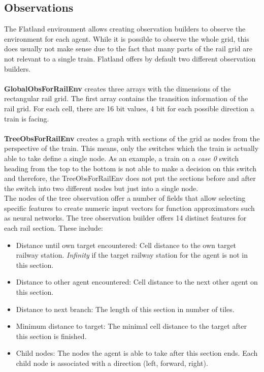 \subsection*{Observations}\label{observations}
The Flatland environment allows creating observation builders to observe the environment for each agent. While it is possible to observe the whole grid, this does usually not make sense due to the fact that many parts of the rail grid are not relevant to a single train. Flatland offers by default two different observation builders.\\\\
\textbf{GlobalObsForRailEnv} creates three arrays with the dimensions of the rectangular rail grid. The first array contains the transition information of the rail grid. For each cell, there are 16 bit values, 4 bit for each possible direction a train is facing.\\\\
\textbf{TreeObsForRailEnv} creates a graph with sections of the grid as nodes from the perspective of the train.
This means, only the switches which the train is actually able to take define a single node. As an example, a train on a \textit{case 0} switch heading from the top to the bottom is not able to make a decision on this switch and therefore, the TreeObsForRailEnv does not put the sections before and after the switch into two different nodes but just into a single node.\\
The nodes of the tree observation offer a number of fields that allow selecting specific features to create numeric input vectors for function approximators such as neural networks. The tree observation builder offers 14 distinct features for each rail section. These include:
\begin{itemize}
	\item Distance until own target encountered: Cell distance to the own target railway station. \textit{Infinity} if the target railway station for the agent is not in this section.
	\item Distance to other agent encountered: Cell distance to the next other agent on this section.
	\item Distance to next branch: The length of this section in number of tiles.
	\item Minimum distance to target: The minimal cell distance to the target after this section is finished.
	\item Child nodes: The nodes the agent is able to take after this section ends. Each child node is associated with a direction (left, forward, right).
\end{itemize}
